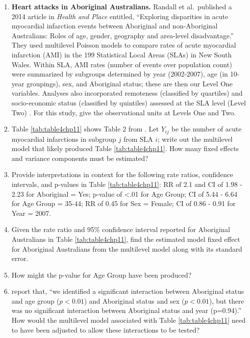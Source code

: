 \documentclass[
]{krantz}
\begin{document}
\begin{enumerate}
\def\labelenumi{\arabic{enumi}.}
\setcounter{enumi}{18}
\item
  \textbf{Heart attacks in Aboriginal Australians.} Randall et al.~published a 2014 article in \emph{Health and Place} entitled, ``Exploring disparities in acute myocardial infarction events between Aboriginal and non-Aboriginal Australians: Roles of age, gender, geography and area-level disadvantage.'' They used multilevel Poisson models to compare rates of acute myocardial infarction (AMI) in the 199 Statistical Local Areas (SLAs) in New South Wales. Within SLA, AMI rates (number of events over population count) were summarized by subgroups determined by year (2002-2007), age (in 10-year groupings), sex, and Aboriginal status; these are then our Level One variables. Analyses also incorporated remoteness (classified by quartiles) and socio-economic status (classified by quintiles) assessed at the SLA level (Level Two) \citep{Randall2014}. For this study, give the observational units at Levels One and Two.
\item
  Table \ref{tab:table4chp11} shows Table 2 from \citet{Randall2014}. Let \(Y_{ij}\) be the number of acute myocardial infarctions in subgroup \(j\) from SLA \(i\); write out the multilevel model that likely produced Table \ref{tab:table4chp11}. How many fixed effects and variance components must be estimated?
\item
  Provide interpretations in context for the following rate ratios, confidence intervals, and p-values in Table \ref{tab:table4chp11}: RR of 2.1 and CI of 1.98 - 2.23 for Aboriginal = Yes; p-value of \textless.01 for Age Group; CI of 5.44 - 6.64 for Age Group = 35-44; RR of 0.45 for Sex = Female; CI of 0.86 - 0.91 for Year = 2007.
\item
  Given the rate ratio and 95\% confidence interval reported for Aboriginal Australians in Table \ref{tab:table4chp11}, find the estimated model fixed effect for Aboriginal Australians from the multilevel model along with its standard error.
\item
  How might the p-value for Age Group have been produced?
\item
  \citet{Randall2014} report that, ``we identified a significant interaction between Aboriginal status and age group (\(p<0.01\)) and Aboriginal status and sex (\(p<0.01\)), but there was no significant interaction between Aboriginal status and year (p=0.94).'' How would the multilevel model associated with Table \ref{tab:table4chp11} need to have been adjusted to allow these interactions to be tested?
\end{enumerate}
\end{document}
